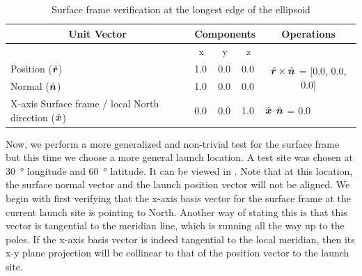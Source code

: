 \begin{table}[htb]
\centering
\captionsetup{justification=centering}
\caption{Surface frame verification at the longest edge of the ellipsoid}
\label{tab:longest_edge_surface_frame_vv}
\begin{tabular}{|l|l|l|l|c|}
\hline
\multicolumn{1}{|c|}{\textbf{Unit Vector}} & \multicolumn{3}{c|}{\textbf{Components}} & \textbf{Operations} \\ \hline
\multicolumn{1}{|c|}{} & \multicolumn{1}{c|}{x} & \multicolumn{1}{c|}{y} & \multicolumn{1}{c|}{z} & \multicolumn{1}{l|}{} \\ \hline
Position ($\hat{\bm{r}}$) & 1.0 & 0.0 & 0.0 & \multirow{2}{*}{$\hat{\bm{r}} \times \hat{\bm{n}}$ = {[}0.0, 0.0, 0.0{]}} \\ \cline{1-4}
Normal ($\hat{\bm{n}}$) & 1.0 & 0.0 & 0.0 &  \\ \hline
X-axis Surface frame / local North direction ($\hat{\bm{x}}$) & 0.0 & 0.0 & 1.0 & \multicolumn{1}{l|}{$\hat{\bm{x}} \cdotp \hat{\bm{n}}$ = 0.0} \\ \hline
\end{tabular}
\end{table}
\FloatBarrier
Now, we perform a more generalized and non-trivial test for the surface frame but this time we choose a more general launch location. A test site was chosen at \SI{30}{\degree} longitude and \SI{60}{\degree} latitude. It can be viewed in . Note that at this location, the surface normal vector and the launch position vector will not be aligned. We begin with first verifying that the x-axis basis vector for the surface frame at the current launch site is pointing to North. Another way of stating this is that this vector is tangential to the meridian line, which is running all the way up to the poles. If the x-axis basis vector is indeed tangential to the local meridian, then its x-y plane projection will be collinear to that of the position vector to the launch site.

